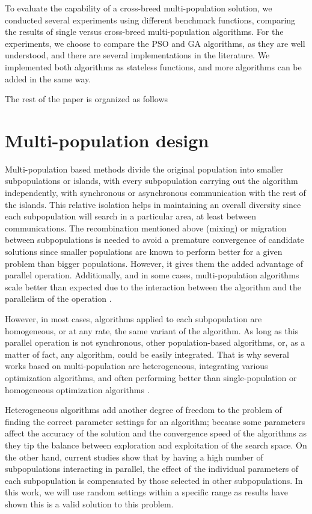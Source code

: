 \documentclass[review]{elsarticle}
\begin{document}
To evaluate the capability of a cross-breed multi-population solution,
we conducted several experiments using different benchmark functions, comparing the
results of single versus cross-breed multi-population algorithms. For the experiments, we choose to
compare the PSO and GA algorithms, as they are well understood, and there are
several implementations in the literature. We implemented both algorithms as
stateless functions, and more algorithms can be added in the same way.

The rest of the paper is organized as follows

\section{Multi-population design}

Multi-population based methods divide the original population into
smaller subpopulations or islands, with every subpopulation carrying out the
algorithm independently, with synchronous or asynchronous communication with the
rest of the islands. This relative isolation helps in maintaining an overall
diversity since each subpopulation will search in a particular area, at least
between communications. The recombination mentioned above (mixing) or migration
between subpopulations is needed to avoid a premature convergence of candidate
solutions since smaller populations are known to perform better for a given
problem than bigger populations. However, it gives them the added advantage of
parallel operation. Additionally, and in some cases, multi-population algorithms
scale better than expected due to the interaction between the algorithm and the
parallelism of the operation \cite{ALBA20027}.

However, in most cases, algorithms applied to each subpopulation are
homogeneous, or at any rate, the same variant of the algorithm. As long as this
parallel operation is not synchronous, other population-based algorithms, or, as
a matter of fact, any algorithm, could be easily integrated. That is why several
works based on multi-population are heterogeneous, integrating various
optimization algorithms, and often performing better than single-population or
homogeneous optimization algorithms \cite{wu2016differential,nseef2016adaptive}.

Heterogeneous algorithms add another degree of freedom to the problem of finding
the correct parameter settings for an algorithm; because some parameters affect
the accuracy of the solution and the convergence speed of the algorithms as they
tip the balance between exploration and exploitation of the search space. On the
other hand, current studies show that by having a high number of subpopulations
interacting in parallel, the effect of the individual parameters of each
subpopulation is compensated by those selected in other subpopulations. In this
work, we will use random settings within a specific range as results have shown
this is a valid solution to this problem. 
\end{document}

